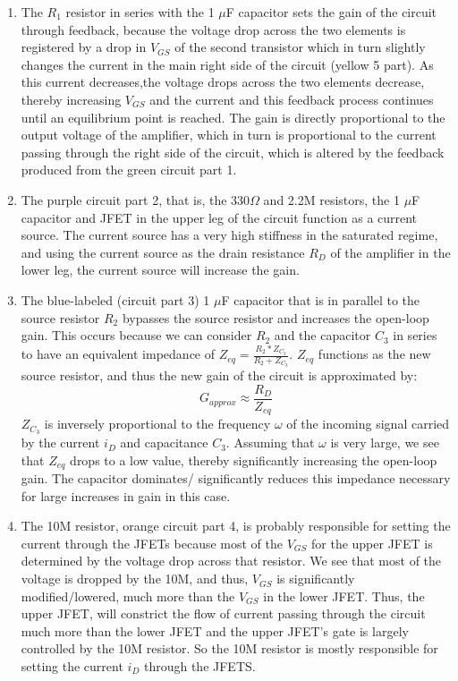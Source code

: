 \documentclass{article}
\begin{document}
    \begin{enumerate}
        \item The $R_1$ resistor in series with the 1 $\mu$F capacitor sets the gain of the circuit through feedback, because the voltage drop across the two elements is registered by a drop in $V_{GS}$ of the second transistor which in turn slightly changes the current in the main right side of the circuit (yellow 5 part). As this current decreases,the voltage drops across the two elements decrease, thereby increasing $V_{GS}$ and the current and this feedback process continues until an equilibrium point is reached. The gain is directly proportional to the output voltage of the amplifier, which in turn is proportional to the current passing through the right side of the circuit, which is altered by the feedback produced from the green circuit part 1.
        \item The purple circuit part 2, that is, the 330$\Omega$ and 2.2M resistors, the 1 $\mu$F capacitor and JFET in the upper leg of the circuit function as a current source. The current source has a very high stiffness in the saturated regime, and using the current source as the drain resistance $R_D$ of the amplifier in the lower leg, the current source will increase the gain.
        \item The blue-labeled (circuit part 3) 1 $\mu$F capacitor that is in parallel to the source resistor $R_2$ bypasses the source resistor and increases the open-loop gain. This occurs because we can consider $R_2$ and the capacitor $C_3$ in series to have an equivalent impedance of $Z_{eq} = \frac{R_2 * Z_{C_3}}{R_2 + Z_{C_3}}$. $Z_{eq}$ functions as the new source resistor, and thus the new gain of the circuit is approximated by:
        \begin{equation}
            G_{approx} \approx \frac{R_D}{Z_{eq}}
        \end{equation}
        $Z_{C_3}$ is inversely proportional to the frequency $\omega$ of the incoming signal carried by the current $i_D$ and capacitance $C_3$. Assuming that $\omega$ is very large, we see that $Z_{eq}$ drops to a low value, thereby significantly increasing the open-loop gain. The capacitor dominates/ significantly reduces this impedance necessary for large increases in gain in this case.
        \item The 10M resistor, orange circuit part 4, is probably responsible for setting the current through the JFETs because most of the $V_{GS}$ for the upper JFET is determined by the voltage drop across that resistor. We see that most of the voltage is dropped by the 10M, and thus, $V_{GS}$ is significantly modified/lowered, much more than the $V_{GS}$ in the lower JFET. Thus, the upper JFET, will constrict the flow of current passing through the circuit much more than the lower JFET and the upper JFET's gate is largely controlled by the 10M resistor. So the 10M resistor is mostly responsible for setting the current $i_D$ through the JFETS.

\end{enumerate}
\end{document}
